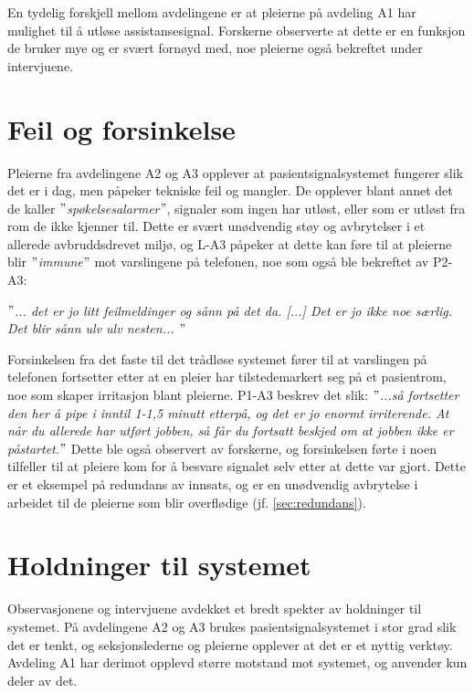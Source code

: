 \noindent
En tydelig forskjell mellom avdelingene er at pleierne på avdeling A1 har mulighet til å utløse assistansesignal. Forskerne observerte at dette er en funksjon de bruker mye og er svært fornøyd med, noe pleierne også bekreftet under intervjuene. 

\section{Feil og forsinkelse}
Pleierne fra avdelingene A2 og A3 opplever at pasientsignalsystemet fungerer slik det er i dag, men påpeker tekniske feil og mangler. De opplever blant annet det de kaller \textit{$"$spøkelsesalarmer$"$}, signaler som ingen har utløst, eller som er utløst fra rom de ikke kjenner til. Dette er svært unødvendig støy og avbrytelser i et allerede avbruddsdrevet miljø, og L-A3 påpeker at dette kan føre til at pleierne blir \textit{$"$immune$"$} mot varslingene på telefonen, noe som også ble bekreftet av P2-A3:

\noindent
\textit{$"$... det er jo litt feilmeldinger og sånn på det da. [...] Det er jo ikke noe særlig. Det blir sånn ulv ulv nesten... $"$}

\noindent 
Forsinkelsen fra det faste til det trådløse systemet fører til at varslingen på telefonen fortsetter etter at en pleier har tilstedemarkert seg på et pasientrom, noe som skaper irritasjon blant pleierne. P1-A3 beskrev det slik: \textit{$"$...så fortsetter den her å pipe i inntil 1-1,5 minutt etterpå, og det er jo enormt irriterende. At når du allerede har utført jobben, så får du fortsatt beskjed om at jobben ikke er påstartet.$"$} Dette ble også observert av forskerne, og forsinkelsen førte i noen tilfeller til at pleiere kom for å besvare signalet selv etter at dette var gjort. Dette er et eksempel på redundans av innsats, og er en unødvendig avbrytelse i arbeidet til de pleierne som blir overflødige (jf. \ref {sec:redundans}).

\section{Holdninger til systemet}
Observasjonene og intervjuene avdekket et bredt spekter av holdninger til systemet. På avdelingene A2 og A3 brukes pasientsignalsystemet i stor grad slik det er tenkt, og seksjonslederne og pleierne opplever at det er et nyttig verktøy. Avdeling A1 har derimot opplevd større motstand mot systemet, og anvender kun deler av det.

